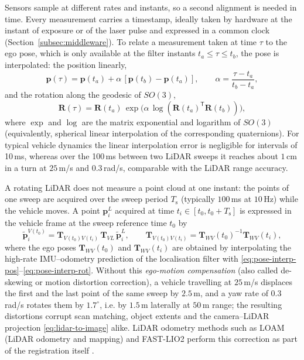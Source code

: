 \documentclass[graybox,envcountchap]{style/SNmono}
\begin{document}
Sensors sample at different rates and instants, so a second alignment is needed in time. Every measurement carries a timestamp, ideally taken by hardware at the instant of exposure or of the laser pulse and expressed in a common clock (Section~\ref{subsec:middleware}). To relate a measurement taken at time $\tau$ to the ego pose, which is only available at the filter instants $t_{a}\le\tau\le t_{b}$, the pose is interpolated: the position linearly,
\begin{equation}
\mathbf{p}(\tau)=\mathbf{p}(t_{a})+\alpha\,[\mathbf{p}(t_{b})-\mathbf{p}(t_{a})],\qquad \alpha=\frac{\tau-t_{a}}{t_{b}-t_{a}},
\label{eq:pose-interp-pos}
\end{equation}
and the rotation along the geodesic of $SO(3)$,
\begin{equation}
\mathbf{R}(\tau)=\mathbf{R}(t_{a})\,\exp\!\big(\alpha\,\log(\mathbf{R}(t_{a})^{\mathsf T}\mathbf{R}(t_{b}))\big),
\label{eq:pose-interp-rot}
\end{equation}
where $\exp$ and $\log$ are the matrix exponential and logarithm of $SO(3)$ (equivalently, spherical linear interpolation of the corresponding quaternions). For typical vehicle dynamics the linear interpolation error is negligible for intervals of 10\,ms, whereas over the 100\,ms between two LiDAR sweeps it reaches about $1$\,cm in a turn at $25$\,m/s and $0.3$\,rad/s, comparable with the LiDAR range accuracy.

A rotating LiDAR does not measure a point cloud at one instant: the points of one sweep are acquired over the sweep period $T_{\mathrm{s}}$ (typically $100$\,ms at $10$\,Hz) while the vehicle moves. A point $\mathbf{p}_{i}^{L}$ acquired at time $t_{i}\in[t_{0},t_{0}+T_{\mathrm{s}}]$ is expressed in the vehicle frame at the sweep reference time $t_{0}$ by
\begin{equation}
\tilde{\mathbf{p}}_{i}^{V(t_{0})}=\mathbf{T}_{V(t_{0})V(t_{i})}\,\mathbf{T}_{V\!L}\,\tilde{\mathbf{p}}_{i}^{L},
\qquad
\mathbf{T}_{V(t_{0})V(t_{i})}=\mathbf{T}_{W\!V}(t_{0})^{-1}\mathbf{T}_{W\!V}(t_{i}),
\label{eq:motion-compensation}
\end{equation}
where the ego poses $\mathbf{T}_{W\!V}(t_{0})$ and $\mathbf{T}_{W\!V}(t_{i})$ are obtained by interpolating the high-rate IMU--odometry prediction of the localisation filter with \eqref{eq:pose-interp-pos}--\eqref{eq:pose-interp-rot}. Without this \emph{ego-motion compensation} (also called de-skewing or motion distortion correction), a vehicle travelling at $25$\,m/s displaces the first and the last point of the same sweep by $2.5$\,m, and a yaw rate of $0.3$\,rad/s rotates them by $1.7^{\circ}$, i.e. by $1.5$\,m laterally at $50$\,m range; the resulting distortions corrupt scan matching, object extents and the camera--LiDAR projection \eqref{eq:lidar-to-image} alike. LiDAR odometry methods such as LOAM (LiDAR odometry and mapping) and FAST-LIO2 perform this correction as part of the registration itself \cite{zhang2014_loam,xu2022_fastlio2}.
\end{document}

